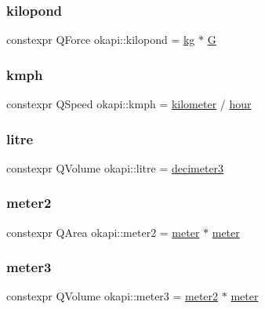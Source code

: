 \subsubsection{\texorpdfstring{kilopond}{kilopond}}
{\footnotesize\ttfamily constexpr Q\+Force okapi\+::kilopond = \mbox{\hyperlink{namespaceokapi_afcc67eb55c70e21f82cbee49aa19d05a}{kg}} $\ast$ \mbox{\hyperlink{namespaceokapi_a6e00ff72f863a56a3fc99ca94f106a5a}{G}}}

\mbox{\label{namespaceokapi_af18e23455e066dcbca14e9b674f2473b}} 
\subsubsection{\texorpdfstring{kmph}{kmph}}
{\footnotesize\ttfamily constexpr Q\+Speed okapi\+::kmph = \mbox{\hyperlink{namespaceokapi_a05acd5fc8bdc7fe19d03a5241ae4bbc7}{kilometer}} / \mbox{\hyperlink{namespaceokapi_a43d321d318cb594798b60a6be26e85ce}{hour}}}

\mbox{\label{namespaceokapi_a877d0e470662f3b0ed2525af2740a761}} 
\subsubsection{\texorpdfstring{litre}{litre}}
{\footnotesize\ttfamily constexpr Q\+Volume okapi\+::litre = \mbox{\hyperlink{namespaceokapi_a4f07207ec37be4257d882710d97a3de9}{decimeter3}}}

\mbox{\label{namespaceokapi_af408c7a86b7f54691246722841817248}} 
\subsubsection{\texorpdfstring{meter2}{meter2}}
{\footnotesize\ttfamily constexpr Q\+Area okapi\+::meter2 = \mbox{\hyperlink{namespaceokapi_a59563b3d4b18633f1c8d852e2932d1db}{meter}} $\ast$ \mbox{\hyperlink{namespaceokapi_a59563b3d4b18633f1c8d852e2932d1db}{meter}}}

\mbox{\label{namespaceokapi_af0b912fc89f2fb06960a683d9894df1f}} 
\subsubsection{\texorpdfstring{meter3}{meter3}}
{\footnotesize\ttfamily constexpr Q\+Volume okapi\+::meter3 = \mbox{\hyperlink{namespaceokapi_af408c7a86b7f54691246722841817248}{meter2}} $\ast$ \mbox{\hyperlink{namespaceokapi_a59563b3d4b18633f1c8d852e2932d1db}{meter}}}

